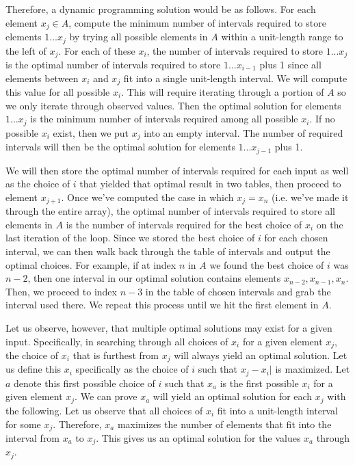 \documentclass[11pt]{article}
\begin{document}
Therefore, a dynamic programming solution would be as follows. For each element $x_j \in A$, compute the minimum number of intervals required to store elements $1...x_j$ by trying all possible elements in $A$ within a unit-length range to the left of $x_j$. For each of these $x_i$, the number of intervals required to store $1...x_j$ is the optimal number of intervals required to store $1...x_{i-1}$ plus 1 since all elements between $x_i$ and $x_j$ fit into a single unit-length interval. We will compute this value for all possible $x_i$. This will require iterating through a portion of $A$ so we only iterate through observed values. Then the optimal solution for elements $1...x_j$ is the minimum number of intervals required among all possible $x_i$. If no possible $x_i$ exist, then we put $x_j$ into an empty interval. The number of required intervals will then be the optimal solution for elements $1...x_{j-1}$ plus 1.

We will then store the optimal number of intervals required for each input as well as the choice of $i$ that yielded that optimal result in two tables, then proceed to element $x_{j+1}$. Once we've computed the case in which $x_j = x_n$ (i.e. we've made it through the entire array), the optimal number of intervals required to store all elements in $A$ is the number of intervals required for the best choice of $x_i$ on the last iteration of the loop. Since we stored the best choice of $i$ for each chosen interval, we can then walk back through the table of intervals and output the optimal choices. For example, if at index $n$ in $A$ we found the best choice of $i$ was $n-2$, then one interval in our optimal solution contains elements $x_{n-2}, x_{n-1}, x_n$. Then, we proceed to index $n-3$ in the table of chosen intervals and grab the interval used there. We repeat this process until we hit the first element in $A$.

Let us observe, however, that multiple optimal solutions may exist for a given input. Specifically, in searching through all choices of $x_i$ for a given element $x_j$, the choice of $x_i$ that is furthest from $x_j$ will always yield an optimal solution. Let us define this $x_i$ specifically as the choice of $i$ such that $x_j - x_i|$ is maximized. Let $a$ denote this first possible choice of $i$ such that $x_a$ is the first possible $x_i$ for a given element $x_j$. We can prove $x_a$ will yield an optimal solution for each $x_j$ with the following. Let us observe that all choices of $x_i$ fit into a unit-length interval for some $x_j$. Therefore, $x_a$ maximizes the number of elements that fit into the interval from $x_a$ to $x_j$. This gives us an optimal solution for the values $x_a$ through $x_j$.
\end{document}
